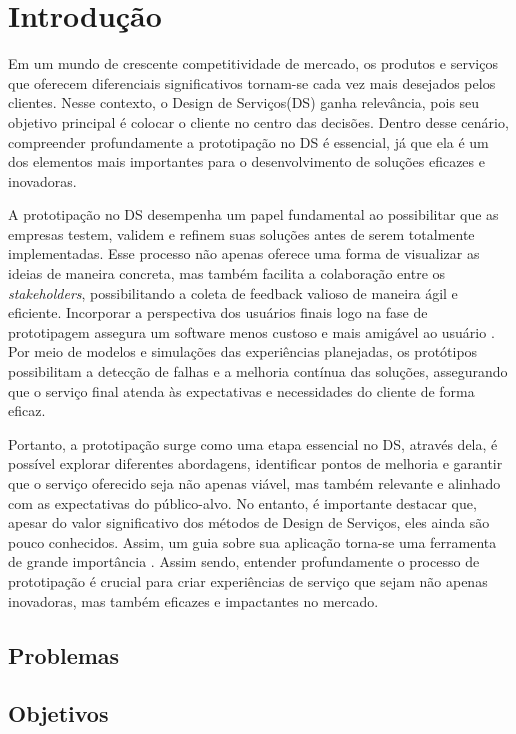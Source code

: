 \chapter[Introdução]{Introdução}


Em um mundo de crescente competitividade de mercado, os produtos e serviços que oferecem diferenciais significativos tornam-se cada vez mais desejados pelos clientes. Nesse contexto, o Design de Serviços(DS) ganha relevância, pois seu objetivo principal é colocar o cliente no centro das decisões. Dentro desse cenário, compreender profundamente a prototipação no DS é essencial, já que ela é um dos elementos mais importantes para o desenvolvimento de soluções eficazes e inovadoras.

A prototipação no DS desempenha um papel fundamental ao possibilitar que as empresas testem, validem e refinem suas soluções antes de serem totalmente implementadas. Esse processo não apenas oferece uma forma de visualizar as ideias de maneira concreta, mas também facilita a colaboração entre os \textit{stakeholders}, possibilitando a coleta de feedback valioso de maneira ágil e eficiente. Incorporar a perspectiva dos usuários finais logo na fase de prototipagem assegura um software menos custoso e mais amigável ao usuário \cite{Mattjus2023}. Por meio de modelos e simulações das experiências planejadas, os protótipos possibilitam a detecção de falhas e a melhoria contínua das soluções, assegurando que o serviço final atenda às expectativas e necessidades do cliente de forma eficaz.

Portanto, a prototipação surge como uma etapa essencial no DS, através dela, é possível explorar diferentes abordagens, identificar pontos de melhoria e garantir que o serviço oferecido seja não apenas viável, mas também relevante e alinhado com as expectativas do público-alvo.  No entanto, é importante destacar que, apesar do valor significativo dos métodos de Design de Serviços, eles ainda são pouco conhecidos. Assim, um guia sobre sua aplicação torna-se uma ferramenta de grande importância \cite{Mattjus2023}. Assim sendo, entender profundamente o processo de prototipação é crucial para criar experiências de serviço que sejam não apenas inovadoras, mas também eficazes e impactantes no mercado.


\section {Problemas}

\section {Objetivos}
